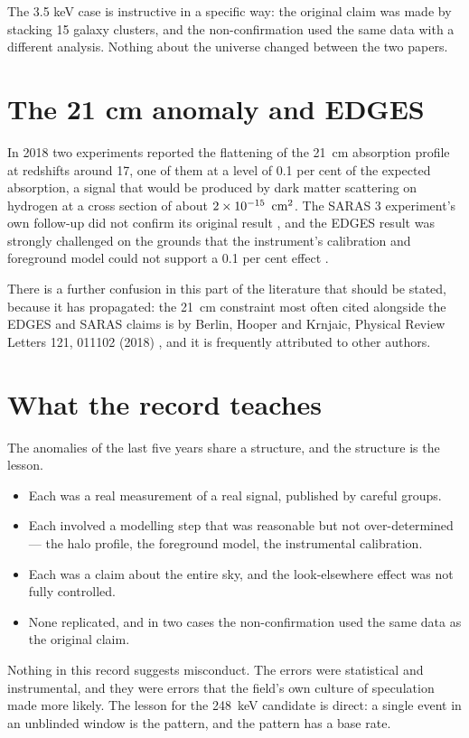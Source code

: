 The 3.5 keV case is instructive in a specific way: the original claim was
made by stacking 15 galaxy clusters, and the non-confirmation used the same
data with a different analysis. Nothing about the universe changed between
the two papers.

\section{The 21 cm anomaly and EDGES}In 2018 two experiments reported the
flattening of the 21~cm absorption profile at redshifts around 17, one of
them at a level of 0.1 per cent of the expected absorption, a signal that
would be produced by dark matter scattering on hydrogen at a cross section
of about $2\times 10^{-15}\ \,\mathrm{cm}^{2}$. The SARAS 3 experiment's own follow-up
did not confirm its original result , and the EDGES result was
strongly challenged on the grounds that the instrument's calibration and
foreground model could not support a 0.1 per cent effect
.

There is a further confusion in this part of the literature that should be
stated, because it has propagated: the 21~cm constraint most often cited
alongside the EDGES and SARAS claims is by Berlin, Hooper and Krnjaic,
Physical Review Letters 121, 011102 (2018) , and it is
frequently attributed to other authors.

\section{What the record teaches}The anomalies of the last five years share a structure, and
the structure is the lesson.

\begin{itemize}
\item Each was a real measurement of a real signal, published by careful
groups.
\item Each involved a modelling step that was reasonable but not
over-determined --- the halo profile, the foreground model, the
instrumental calibration.
\item Each was a claim about the entire sky, and the look-elsewhere effect
was not fully controlled.
\item None replicated, and in two cases the non-confirmation used the same
data as the original claim.
\end{itemize}

Nothing in this record suggests misconduct. The errors were statistical and
instrumental, and they were errors that the field's own culture of
speculation made more likely. The lesson for the 248~keV candidate is
direct: a single event in an unblinded window is the pattern, and the
pattern has a base rate.

